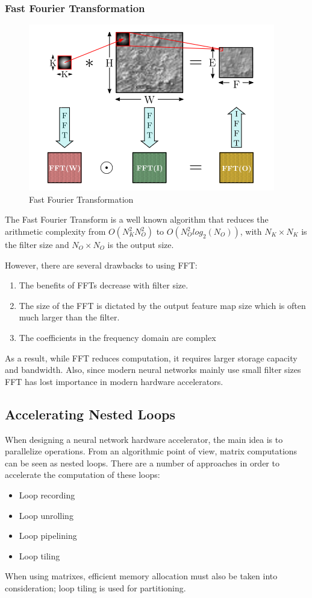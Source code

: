 \subsubsection{Fast Fourier Transformation}
\begin{figure}[H]
    \centering
    \includegraphics[width=0.7\linewidth]{img/fft.png}
    \caption{Fast Fourier Transformation\cite{efficienfProcessingDnn}}
    \label{fig:fft}
\end{figure}

The Fast Fourier Transform is a well known algorithm that reduces the arithmetic complexity from 
$O(N_K^2N_O^2)$ to $O(N_O^2log_2(N_O))$, with $N_K \times N_K$ is the filter size and $N_O \times N_O$ is the output size\cite{efficienfProcessingDnn}.

However, there are several drawbacks to using FFT:
\begin{enumerate}
    \item The benefits of FFTs decrease with filter size.
    \item The size of the FFT is dictated by the output feature map size which is often much larger than the filter.
    \item The coefficients in the frequency domain are complex
\end{enumerate}
As a result, while FFT reduces computation, it requires larger storage capacity and bandwidth. Also, since modern neural networks mainly use small filter sizes FFT has lost importance in modern hardware accelerators.

\subsection{Accelerating Nested Loops}
When designing a neural network hardware accelerator, the main idea is to parallelize operations. From an algorithmic point of view, matrix computations can be seen as nested loops. There are a number of approaches in order to accelerate the computation of these loops:
\begin{itemize}
    \item Loop recording
    \item Loop unrolling
    \item Loop pipelining
    \item Loop tiling
\end{itemize}
When using matrixes, efficient memory allocation must also be taken into consideration; loop tiling is used for partitioning.\cite{CnnFpgaSurvey2}

